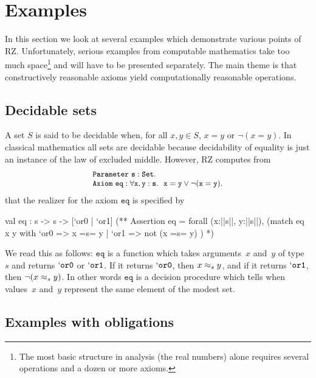 \section{Examples}
\label{sec:examples}

In this section we look at several examples which demonstrate various
points of RZ. Unfortunately, serious examples from computable
mathematics take too much space\footnote{The most basic structure
  in analysis (the real numbers) alone 
  requires several operations and a dozen or more axioms.} and will have to
be presented separately. The main theme is that constructively
reasonable axioms yield computationally reasonable operations.

\subsection{Decidable sets}
\label{sec:decidable-sets}

A set $S$ is said to be decidable when, for all $x, y \in S$, $x = y$
or $\lnot (x = y)$. In classical mathematics all sets are decidable
because decidability of equality is just an instance of the law of
excluded middle. However, RZ computes from
%
\[
\footnotesize
\begin{array}{l}
\iParameter{\mathtt{s}}{\iSet}.\\
\iAxiom{\mathtt{eq}}{\forall\mathtt{x},\mathtt{y}:\mathtt{s}.\ \ \mathtt{x} = \mathtt{y} \lor \lnot(\mathtt{x} = \mathtt{y})}.\\
\end{array}
\]
%
that the realizer for the axiom $\mathtt{eq}$ is specified by
%
\begin{source}
val eq : s -> s -> [`or0 | `or1]
(**  Assertion eq =
       forall (x:||s||, y:||s||),
         (match eq x y with
            `or0 => x =s= y
          | `or1 => not (x =s= y) )
*)
\end{source}
%
We read this as follows: $\mathtt{eq}$ is a function which takes
arguments~$x$ and~$y$ of type~$s$ and returns $\mathtt{`or0}$ or
$\mathtt{`or1}$. If it returns $\mathtt{`or0}$, then $x \approx_s y$, and
if it returns $\mathtt{`or1}$, then $\lnot (x \approx_s y)$. In other
words $\mathtt{eq}$ is a decision procedure which tells when
values~$x$ and~$y$ represent the same element of the modest set.

\subsection{Examples with obligations}
\label{sec:exampl-with-oblig}

